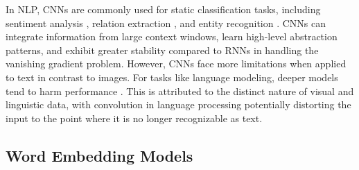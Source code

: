 In \ac{NLP}, \acp{CNN} are commonly used for static classification tasks, including sentiment analysis \citep{kalchbrenner2014convolutional}, relation extraction \citep{nguyen2015relation}, and entity recognition \citep{adel2016comparing}. \acp{CNN} can integrate information from large context windows, learn high-level abstraction patterns, and exhibit greater stability compared to \acp{RNN} in handling the vanishing gradient problem. However, \acp{CNN} face more limitations when applied to text in contrast to images. For tasks like language modeling, deeper models tend to harm performance \citep{pham2016convolutional}. This is attributed to the distinct nature of visual and linguistic data, with convolution in language processing potentially distorting the input to the point where it is no longer recognizable as text.



\subsection{Word Embedding Models}

